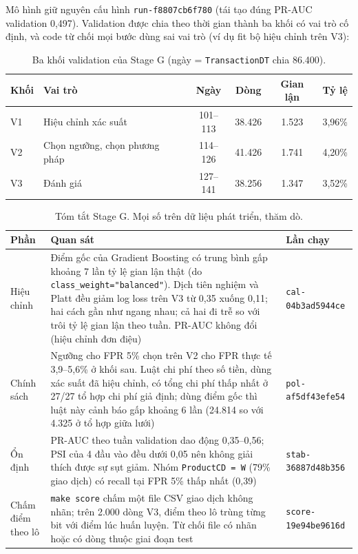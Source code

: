 \documentclass[11pt,a4paper]{article}
\newcommand{\code}[1]{\texttt{\small #1}}
\begin{document}
Mô hình giữ nguyên cấu hình \code{run-f8807cb6f780} (tái tạo đúng PR-AUC validation 0,497). Validation được chia theo thời gian thành ba khối có vai trò cố định, và code từ chối mọi bước dùng sai vai trò (ví dụ fit bộ hiệu chỉnh trên V3):

\begin{table}[H]\centering
\caption{Ba khối validation của Stage G (ngày = \code{TransactionDT} chia 86.400).}
\begin{tabular}{@{}llcccc@{}}
\toprule
Khối & Vai trò & Ngày & Dòng & Gian lận & Tỷ lệ \\ \midrule
V1 & Hiệu chỉnh xác suất & 101--113 & 38.426 & 1.523 & 3,96\% \\
V2 & Chọn ngưỡng, chọn phương pháp & 114--126 & 41.426 & 1.741 & 4,20\% \\
V3 & Đánh giá & 127--141 & 38.256 & 1.347 & 3,52\% \\ \bottomrule
\end{tabular}
\end{table}

\begin{table}[H]\centering\small
\caption{Tóm tắt Stage G. Mọi số trên dữ liệu phát triển, thăm dò.}
\begin{tabularx}{\linewidth}{@{}lXl@{}}
\toprule
Phần & Quan sát & Lần chạy \\ \midrule
Hiệu chỉnh & Điểm gốc của Gradient Boosting có trung bình gấp khoảng 7 lần tỷ lệ gian lận thật (do \code{class\_weight="balanced"}). Dịch tiên nghiệm và Platt đều giảm log loss trên V3 từ 0,35 xuống 0,11; hai cách gần như ngang nhau; cả hai đi trễ so với trôi tỷ lệ gian lận theo tuần. PR-AUC không đổi (hiệu chỉnh đơn điệu) & \code{cal-04b3ad5944ce} \\
Chính sách & Ngưỡng cho FPR 5\% chọn trên V2 cho FPR thực tế 3,9--5,6\% ở khối sau. Luật chi phí theo số tiền, dùng xác suất đã hiệu chỉnh, có tổng chi phí thấp nhất ở 27/27 tổ hợp chi phí giả định; dùng điểm gốc thì luật này cảnh báo gấp khoảng 6 lần (24.814 so với 4.325 ở tổ hợp giữa lưới) & \code{pol-af5df43efe54} \\
Ổn định & PR-AUC theo tuần validation dao động 0,35--0,56; PSI của 4 đầu vào đều dưới 0,05 nên không giải thích được sự sụt giảm. Nhóm \code{ProductCD = W} (79\% giao dịch) có recall tại FPR 5\% thấp nhất (0,39) & \code{stab-36887d48b356} \\
Chấm điểm theo lô & \code{make score} chấm một file CSV giao dịch không nhãn; trên 2.000 dòng V3, điểm theo lô trùng từng bit với điểm lúc huấn luyện. Từ chối file có nhãn hoặc có dòng thuộc giai đoạn test & \code{score-19e94be9616d} \\ \bottomrule
\end{tabularx}
\end{table}
\end{document}
